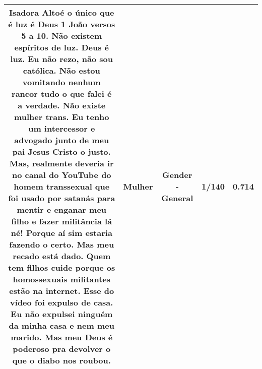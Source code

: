 \documentclass[11pt]{article}
\newlength\mylength
\begin{document}
\begin{center}
\begin{longtable}{|C{.65\mylength}|C{.30\mylength}|C{.12\mylength}|C{.12\mylength}|C{.12\mylength}|}
  \small Isadora Altoé o único que é luz é Deus 1 João versos 5 a 10. Não existem espíritos de luz. Deus é luz. Eu não rezo, não sou católica. Não estou vomitando nenhum rancor tudo o que falei é a verdade. Não existe \textbf{mulher} trans. Eu tenho um intercessor e advogado junto de meu pai Jesus Cristo o justo. Mas, realmente deveria ir no canal do YouTube do homem transsexual que foi usado por satanás para mentir e enganar meu filho e fazer militância lá né! Porque aí sim estaria fazendo o certo. Mas meu recado está dado. Quem tem filhos cuide porque os homossexuais militantes estão na internet. Esse do vídeo foi expulso de casa. Eu não expulsei ninguém da minha casa e nem meu marido. Mas meu Deus é poderoso pra devolver o que o diabo nos roubou.\normalsize   & Mulher & Gender - General & 1/140 & 0.714 \\  \hline

\end{longtable}
\end{center}
\end{document}
